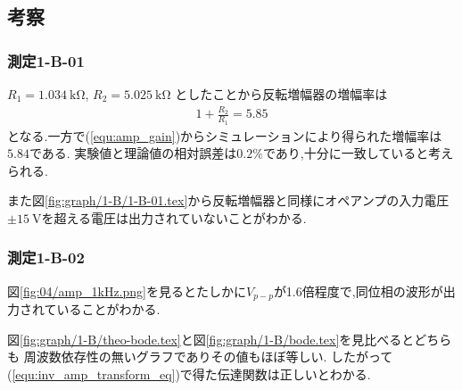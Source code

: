 \subsection{考察}
\subsubsection{測定1-B-01}
$R_1=1.034\ \si{\kilo\ohm}$, $R_2=5.025\ \si{\kilo\ohm}$
としたことから反転増幅器の増幅率は
\begin{align}
  1+\frac{R_2}{R_1}=5.85
\end{align}
となる.一方で(\ref{equ:amp_gain})からシミュレーションにより得られた増幅率は$5.84$である.
実験値と理論値の相対誤差は$0.2\%$であり,十分に一致していると考えられる.

また図\ref{fig:graph/1-B/1-B-01.tex}から反転増幅器と同様にオペアンプの入力電圧$\pm15\ \si{\volt}$を超える電圧は出力されていないことがわかる.
\subsubsection{測定1-B-02}
図\ref{fig:04/amp_1kHz.png}を見るとたしかに$V_{p-p}$が1.6倍程度で,同位相の波形が出力されていることがわかる.

図\ref{fig:graph/1-B/theo-bode.tex}と図\ref{fig:graph/1-B/bode.tex}を見比べるとどちらも
周波数依存性の無いグラフでありその値もほぼ等しい.
したがって(\ref{equ:inv_amp_transform_eq})で得た伝達関数は正しいとわかる.
